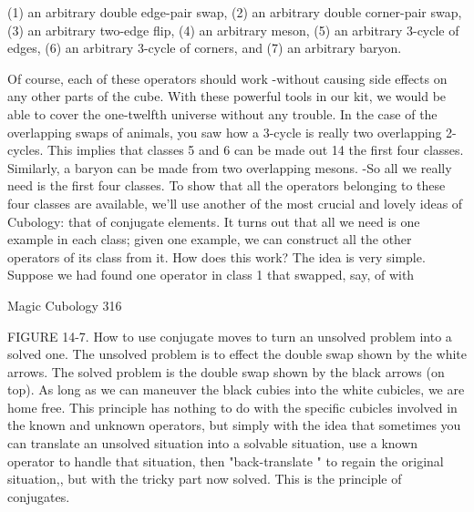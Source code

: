        (1) an arbitrary double edge-pair swap,
       (2) an arbitrary double corner-pair swap,
       (3) an arbitrary two-edge flip,
       (4) an arbitrary meson,
       (5) an arbitrary 3-cycle of edges,
       (6) an arbitrary 3-cycle of corners, and
       (7) an arbitrary baryon.

        Of course, each of these operators should work -without causing side effects
on any other parts of the cube. With these powerful tools in our kit, we would be able
to cover the one-twelfth universe without any trouble. In the case of the overlapping
swaps of animals, you saw how a 3-cycle is really two overlapping 2-cycles. This
implies that classes 5 and 6 can be made out 14 the first four classes. Similarly, a
baryon can be made from two overlapping mesons. -So all we really need is the first
four classes.
        To show that all the operators belonging to these four classes are available,
we'll use another of the most crucial and lovely ideas of Cubology: that of conjugate
elements. It turns out that all we need is one example in each class; given one
example, we can construct all the other operators of its class from it. How does this
work? The idea is very simple.
        Suppose we had found one operator in class 1 that swapped, say, of with




Magic Cubology                                                                     316

FIGURE 14-7. How to use conjugate moves to turn an unsolved problem into a solved
one. The unsolved problem is to effect the double swap shown by the white arrows.
The solved problem is the double swap shown by the black arrows (on top). As long
as we can maneuver the black cubies into the white cubicles, we are home free. This
principle has nothing to do with the specific cubicles involved in the known and
unknown operators, but simply with the idea that sometimes you can translate an
unsolved situation into a solvable situation, use a known operator to handle that
situation, then "back-translate " to regain the original situation,, but with the tricky
part now solved. This is the principle of conjugates.

